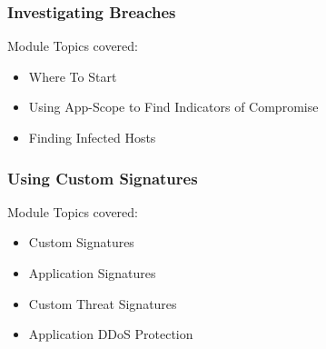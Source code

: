 \subsubsection{Investigating Breaches}
Module Topics covered:
\begin{itemize}
    \item Where To Start
    \item Using App-Scope to Find Indicators of Compromise
    \item Finding Infected Hosts
\end{itemize}

\subsubsection{Using Custom Signatures}
Module Topics covered:
\begin{itemize}
    \item Custom Signatures
    \item Application Signatures
    \item Custom Threat Signatures
    \item Application DDoS Protection
\end{itemize}